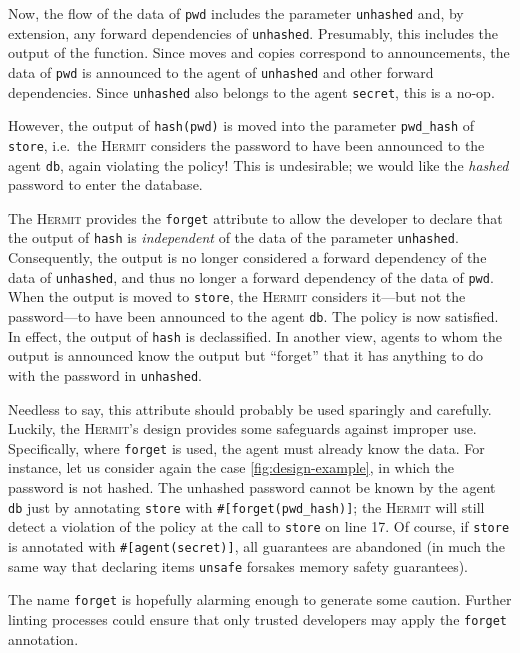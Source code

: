 \documentclass[letterpaper,twocolumn,10pt]{article}
\newcommand{\Hermit}{\textsc{Hermit}\xspace}
\begin{document}
Now, the flow of the data of \lstinline{pwd} includes the parameter \lstinline{unhashed} and, by extension, any forward dependencies of \lstinline{unhashed}.
Presumably, this includes the output of the function.
Since moves and copies correspond to announcements, the data of \lstinline{pwd} is announced to the agent of \lstinline{unhashed} and other forward dependencies.
Since \lstinline{unhashed} also belongs to the agent \lstinline{secret}, this is a no-op.

However, the output of \lstinline{hash(pwd)} is moved into the parameter \lstinline{pwd_hash} of \lstinline{store}, i.e.\ the \Hermit considers the password to have been announced to the agent \lstinline{db}, again violating the policy!
This is undesirable; we would like the \emph{hashed} password to enter the database.

The \Hermit provides the \lstinline{forget} attribute to allow the developer to declare that the output of \lstinline{hash} is \emph{independent} of the data of the parameter \lstinline{unhashed}.
Consequently, the output is no longer considered a forward dependency of the data of \lstinline{unhashed}, and thus no longer a forward dependency of the data of \lstinline{pwd}.
When the output is moved to \lstinline{store}, the \Hermit considers it---but not the password---to have been announced to the agent \lstinline{db}.
The policy is now satisfied.
In effect, the output of \lstinline{hash} is declassified.
In another view, agents to whom the output is announced know the output but ``forget'' that it has anything to do with the password in \lstinline{unhashed}.

Needless to say, this attribute should probably be used sparingly and carefully.
Luckily, the \Hermit's design provides some safeguards against improper use.
Specifically, where \lstinline{forget} is used, the agent must already know the data.
For instance, let us consider again the case \cref{fig:design-example}, in which the password is not hashed.
The unhashed password cannot be known by the agent \lstinline{db} just by annotating \lstinline{store} with \lstinline{#[forget(pwd_hash)]}; the \Hermit will still detect a violation of the policy at the call to \lstinline{store} on line 17.
Of course, if \lstinline{store} is annotated with \lstinline{#[agent(secret)]}, all guarantees are abandoned (in much the same way that declaring items \lstinline{unsafe} forsakes memory safety guarantees).

The name \lstinline{forget} is hopefully alarming enough to generate some caution.
Further linting processes could ensure that only trusted developers may apply the \lstinline{forget} annotation.
\end{document}
